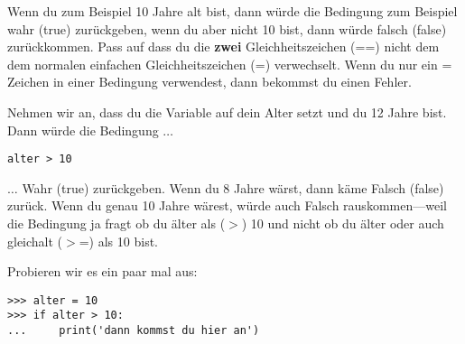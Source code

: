 Wenn du zum Beispiel 10 Jahre alt bist, dann würde die Bedingung  zum Beispiel wahr (true) zurückgeben, wenn du aber nicht 10 bist, dann würde falsch (false) zurückkommen. Pass auf dass du die \textbf{zwei} Gleichheitszeichen (==) nicht dem dem normalen einfachen Gleichheitszeichen (=) verwechselt. Wenn du nur ein = Zeichen in einer Bedingung verwendest, dann bekommst du einen Fehler.
\par
Nehmen wir an, dass du die Variable  auf dein Alter setzt und du 12 Jahre bist. Dann würde die Bedingung $\ldots$

\begin{Verbatim}[frame=single]
alter > 10
\end{Verbatim}

$\ldots$ Wahr (true) zurückgeben. Wenn du 8 Jahre wärst, dann käme Falsch (false) zurück. Wenn du genau 10 Jahre wärest, würde auch Falsch rauskommen---weil die Bedingung ja fragt ob du älter als ($>$) 10 und nicht ob du älter oder auch gleichalt ($>$=) als 10 bist.

Probieren wir es ein paar mal aus:

\begin{Verbatim}[frame=single]
>>> alter = 10
>>> if alter > 10:
...     print('dann kommst du hier an')
\end{Verbatim}

